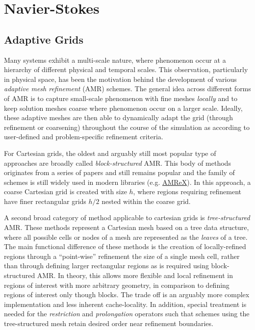 \chapter{Navier-Stokes}
\label{chap:navier-stokes}

\section{Adaptive Grids}

Many systems exhibit a multi-scale nature, where phenomenon occur at a
hierarchy of different physical and temporal scales. This observation,
particularly in physical space, has been the motivation behind the development
of various \emph{adaptive mesh refinement} (AMR) schemes. The general idea
across different forms of AMR is to capture small-scale phenomenon with fine
meshes \emph{locally} and to keep solution meshes coarse where phenomenon occur
on a larger scale. Ideally, these adaptive meshes are then able to dynamically
adapt the grid (through refinement or coarsening) throughout the course of the
simulation as according to user-defined and problem-specific refinement
criteria.

For Cartesian grids, the oldest and arguably still most popular type of
approaches are broadly called \emph{block-structured} AMR. This body of methods
originates from a series of papers \cite{berger_adaptive_1984} and still
remains popular and the family of schemes is still widely used in modern
libraries (e.g. \href{https://amrex-codes.github.io/amrex/}{AMReX}). In this
approach, a coarse Cartesian grid is created with size \(h\), where regions
requiring refinement have finer rectangular grids \(h/2\) nested within the
coarse grid.

A second broad category of method applicable to cartesian grids is
\emph{tree-structured} AMR. These methods represent a Cartesian mesh based on a
tree data structure, where all possible cells or nodes of a mesh are
represented as the \emph{leaves} of a tree. The main functional difference of
these methods is the creation of locally-refined regions through a
``point-wise'' refinement the size of a single mesh cell, rather than through
defining larger rectangular regions as is required using block-structured AMR.
In theory, this allows more flexible and local refinement in regions of
interest with more arbitrary geometry, in comparison to defining regions of
interest only though blocks. The trade off is an arguably more complex
implementation and less inherent cache-locality. In addition, special treatment
is needed for the \emph{restriction} and \emph{prolongation} operators such
that schemes using the tree-structured mesh retain desired order near
refinement boundaries.

